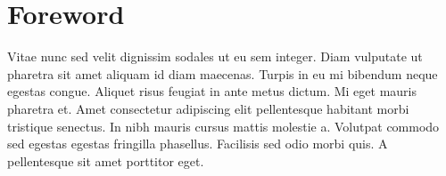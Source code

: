 \section*{Foreword}

Vitae nunc sed velit dignissim sodales ut eu sem integer. Diam vulputate ut
pharetra sit amet aliquam id diam maecenas. Turpis in eu mi bibendum neque
egestas congue. Aliquet risus feugiat in ante metus dictum. Mi eget mauris
pharetra et. Amet consectetur adipiscing elit pellentesque habitant morbi
tristique senectus. In nibh mauris cursus mattis molestie a. Volutpat commodo
sed egestas egestas fringilla phasellus. Facilisis sed odio morbi quis. A
pellentesque sit amet porttitor eget.
